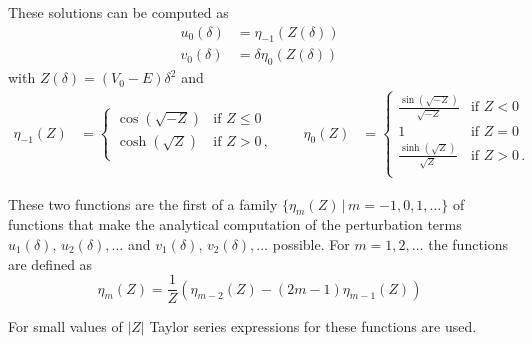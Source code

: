 These solutions can be computed as
\begin{align*}
    u_0(\delta) & = \eta_{-1}\left(Z(\delta)\right)      \\
    v_0(\delta) & = \delta\eta_{0}\left(Z(\delta)\right)
\end{align*} with \(Z(\delta) = (V_0-E)\delta^2\) and
\begin{align*}
    \eta_{-1}(Z) & = \begin{cases}
        \cos(\sqrt{-Z}) & \text{if } Z \leq 0 \\
        \cosh(\sqrt{Z}) & \text{if } Z > 0\,, \\
    \end{cases} \qquad
    \eta_{0}(Z)  & = \begin{cases}
        \frac{\sin(\sqrt{-Z})}{\sqrt{-Z}} & \text{if } Z < 0    \\
        1                                 & \text{if } Z = 0    \\
        \frac{\sinh(\sqrt{Z})}{\sqrt{Z}}  & \text{if } Z > 0\,. \\
    \end{cases}
\end{align*}

These two functions are the first of a family $\{ \eta_m(Z)\,|\,m=-1,0,1,\ldots\}$ of functions that make the analytical computation of the perturbation terms \(u_1(\delta),\, u_2(\delta), \dots\) and \(v_1(\delta),\, v_2(\delta), \dots\) possible.
For $m=1,2,\ldots$ the functions are defined as
\[ \eta_{m}(Z) = \frac{1}{Z}\left(\eta_{m-2}(Z) - (2m-1)\eta_{m-1}(Z)\right) \]

For small values of $|Z|$ Taylor series expressions for these functions are used.



